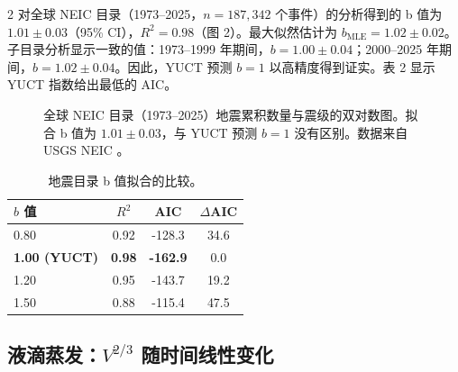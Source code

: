 \documentclass[11pt,a4paper]{article}
\begin{document}
\begin{multicols}{2}
		对全球 NEIC 目录（1973–2025，\(n = 187,342\) 个事件）的分析得到的 b 值为 \(1.01 \pm 0.03\)（95\% CI），\(R^2 = 0.98\)（图 2）。最大似然估计为 \(b_{\text{MLE}} = 1.02 \pm 0.02\)。子目录分析显示一致的值：1973–1999 年期间，\(b = 1.00 \pm 0.04\)；2000–2025 年期间，\(b = 1.02 \pm 0.04\)。因此，YUCT 预测 \(b = 1\) 以高精度得到证实。表 2 显示 YUCT 指数给出最低的 AIC。
		
		\begin{figure}[htbp]
			\centering
			\caption{全球 NEIC 目录（1973–2025）地震累积数量与震级的双对数图。拟合 b 值为 \(1.01 \pm 0.03\)，与 YUCT 预测 \(b = 1\) 没有区别。数据来自 USGS NEIC \cite{USGSNEIC}。}
			\label{fig:earthquakes}
		\end{figure}
		
		\begin{table}[htbp]
			\centering
			\caption{地震目录 b 值拟合的比较。}
			\label{tab:earthquakes}
			\begin{tabular}{lccc}
				\toprule
				\textbf{$b$ 值} & $R^2$ & AIC & $\Delta$AIC \\
				\midrule
				0.80 & 0.92 & -128.3 & 34.6 \\
				\textbf{1.00 (YUCT)} & \textbf{0.98} & \textbf{-162.9} & 0.0 \\
				1.20 & 0.95 & -143.7 & 19.2 \\
				1.50 & 0.88 & -115.4 & 47.5 \\
				\bottomrule
			\end{tabular}
		\end{table}
		
		\subsection{液滴蒸发：\(V^{2/3}\) 随时间线性变化}
		

\end{multicols}
\end{document}
